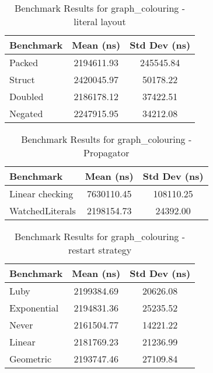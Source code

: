 \begin{table}[h]
    \centering
    \caption{Benchmark Results for graph_colouring - literal layout}
    \begin{tabular}{|l|c|c|}
        \hline
        Benchmark & Mean (ns) & Std Dev (ns) \\
        \hline
        Packed & 2194611.93 & 245545.84 \\
        Struct & 2420045.97 & 50178.22 \\
        Doubled & 2186178.12 & 37422.51 \\
        Negated & 2247915.95 & 34212.08 \\
        \hline
    \end{tabular}
\end{table}


\begin{table}[h]
    \centering
    \caption{Benchmark Results for graph_colouring - Propagator}
    \begin{tabular}{|l|c|c|}
        \hline
        Benchmark & Mean (ns) & Std Dev (ns) \\
        \hline
        Linear checking & 7630110.45 & 108110.25 \\
        WatchedLiterals & 2198154.73 & 24392.00 \\
        \hline
    \end{tabular}
\end{table}


\begin{table}[h]
    \centering
    \caption{Benchmark Results for graph_colouring - restart strategy}
    \begin{tabular}{|l|c|c|}
        \hline
        Benchmark & Mean (ns) & Std Dev (ns) \\
        \hline
        Luby & 2199384.69 & 20626.08 \\
        Exponential & 2194831.36 & 25235.52 \\
        Never & 2161504.77 & 14221.22 \\
        Linear & 2181769.23 & 21236.99 \\
        Geometric & 2193747.46 & 27109.84 \\
        \hline
    \end{tabular}
\end{table}

